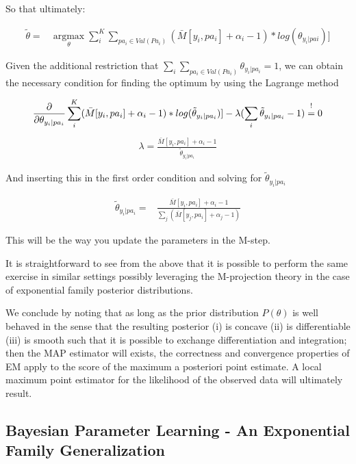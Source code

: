 \documentclass[11pt]{article}
\begin{document}
\begin{article}
So that ultimately:

\begin{align} \label{eq:solution2}
\tilde{\theta} =& \operatorname*{argmax}_{\theta} \sum_i^K  \sum_{pa_i \in Val(Pa_i)} (\bar{M}[y_i, pa_{i}] + \alpha_i - 1) * log(\theta_{y_i | pa{i}})] 
\end{align}

Given the additional restriction that \(\sum_i \sum_{pa_i \in
   Val(Pa_i)} \theta_{y_i | pa_{i}} = 1\), we can obtain the necessary
condition for finding the optimum by using the Lagrange method

\begin{align} \label{eq:first-order1}
\frac{\partial}{\partial \theta_{y_i | pa_{i}}} \sum_i^K (\bar{M}[y_i, pa_{i}] + \alpha_i - 1) * log(\tilde{\theta}_{y_i | pa_{i}})] - \lambda (\sum_i \tilde{\theta}_{y_i | pa_{i}} - 1) \mathrel{\stackon[5pt]{$=$}{$\scriptstyle!$}} 0
\end{align}
\begin{align} \label{eq:first-order2}
\lambda = \frac{\bar{M}[y_i, pa_{i}] + \alpha_i - 1}{\tilde{\theta}_{y_i | pa_{i}}}
\end{align}

And inserting this in the first order condition and solving for
\(\tilde{\theta}_{y_i | pa_{i}}\)

\begin{align} \label{eq:solution}
\tilde{\theta}_{y_i | pa_{i}} =& \frac{\bar{M}[y_i, pa_{i}] + \alpha_i - 1}{\sum_j (\bar{M}[y_j, pa_{i}] + \alpha_j - 1)}
\end{align}

This will be the way you update the parameters in the M-step.

It is straightforward to see from the above that it is possible to
perform the same exercise in similar settings possibly leveraging
the M-projection theory in the case of exponential family posterior
distributions. 

We conclude by noting that as long as the prior distribution
\(P(\theta)\) is well behaved in the sense that the resulting
posterior (i) is concave (ii) is differentiable (iii) is smooth
such that it is possible to exchange differentiation and
integration; then the MAP estimator will exists, the correctness
and convergence properties of EM apply to the score of the maximum
a posteriori point estimate. A local maximum point estimator for
the likelihood of the observed data will ultimately result.

\subsection{Bayesian Parameter Learning - An Exponential Family Generalization}
\label{sec:orgdb0f7b9}


\end{article}
\end{document}
